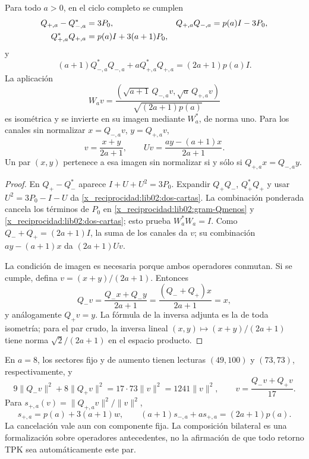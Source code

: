 \begin{theorem}
\label{x_reciprocidad:lib02:balance-bilateral}
Para todo \(a>0\), en el ciclo completo se cumplen
\begin{align}
 Q_{+,a}-Q_{-,a}^*&=3P_0,&
 Q_{+,a}Q_{-,a}&=p(a)I-3P_0,\notag\\
 Q_{+,a}^*Q_{+,a}&=p(a)I+3(a+1)P_0,
 \label{x_reciprocidad:lib02:dos-cartas}
\end{align}
y
\begin{equation}
 (a+1)Q_{-,a}^*Q_{-,a}
 +aQ_{+,a}^*Q_{+,a}=(2a+1)p(a)I.
 \label{x_reciprocidad:lib02:balance-pesado}
\end{equation}
La aplicación
\begin{equation}
 W_av=\frac{(\sqrt{a+1}\,Q_{-,a}v,
                    \sqrt a\,Q_{+,a}v)}{\sqrt{(2a+1)p(a)}}
 \label{x_reciprocidad:lib02:W}
\end{equation}
es isométrica y se invierte en su imagen mediante \(W_a^*\), de
norma uno. Para los canales sin normalizar \(x=Q_{-,a}v\),
\(y=Q_{+,a}v\),
\begin{equation}
 v=\frac{x+y}{2a+1},\qquad
 Uv=\frac{ay-(a+1)x}{2a+1}.
 \label{x_reciprocidad:lib02:reconstruccion-bilateral}
\end{equation}
Un par \((x,y)\) pertenece a esa imagen sin normalizar si y sólo si
\(Q_{+,a}x=Q_{-,a}y\).
\end{theorem}
\begin{proof}
En \(Q_+-Q_-^*\) aparece \(I+U+U^2=3P_0\). Expandir
\(Q_+Q_-\), \(Q_+^*Q_+\) y usar
\(U^2=3P_0-I-U\) da \eqref{x_reciprocidad:lib02:dos-cartas}. La combinación
ponderada cancela los términos de \(P_0\) en
\eqref{x_reciprocidad:lib02:gram-Qmenos} y \eqref{x_reciprocidad:lib02:dos-cartas}; esto prueba
\(W_a^*W_a=I\). Como \(Q_-+Q_+=(2a+1)I\), la suma de los
canales da \(v\); su combinación \(ay-(a+1)x\) da
\((2a+1)Uv\).

La condición de imagen es necesaria porque ambos operadores conmutan.
Si se cumple, defina \(v=(x+y)/(2a+1)\). Entonces
\[
 Q_-v=\frac{Q_-x+Q_-y}{2a+1}
 =\frac{(Q_-+Q_+)x}{2a+1}=x,
\]
y análogamente \(Q_+v=y\). La fórmula de la inversa adjunta es la
de toda isometría; para el par crudo, la inversa lineal
\((x,y)\mapsto(x+y)/(2a+1)\) tiene norma
\(\sqrt2/(2a+1)\) en el espacio producto.
\end{proof}

En \(a=8\), los sectores fijo y de aumento tienen lecturas
\((49,100)\) y \((73,73)\), respectivamente, y
\[
 9\|Q_-v\|^2+8\|Q_+v\|^2=17\cdot73\|v\|^2=1241\|v\|^2,
 \qquad v=\frac{Q_-v+Q_+v}{17}.
\]
Para \(s_{+,a}(v)=\|Q_{+,a}v\|^2/\|v\|^2\),
\[
 s_{+,a}=p(a)+3(a+1)w,
 \qquad (a+1)s_{-,a}+a s_{+,a}=(2a+1)p(a).
\]
La cancelación vale aun con componente fija. La composición bilateral es
una formalización sobre operadores antecedentes, no la afirmación de que
todo retorno TPK sea automáticamente este par.

